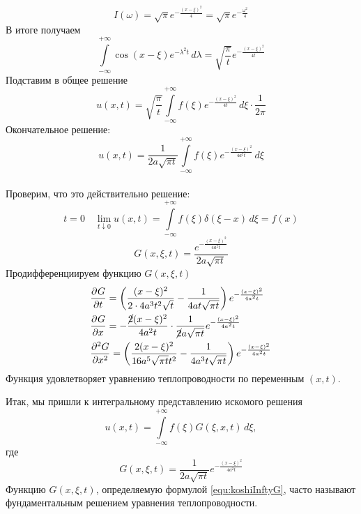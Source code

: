 \[I(\omega) = \sqrt{\pi} e^{- \frac{(x - \xi)^2}{4}} = \sqrt{\pi} e^{-\frac{\omega^2}{4}}\]
В итоге получаем
\[\int\limits_{- \infty}^{ + \infty} \cos (x - \xi) e^{- \lambda^2 t} \, d \lambda = \sqrt{\frac{\pi}{t}}  e^{- \frac{(x - \xi)^2}{4 t}}\]
Подставим в общее решение
\[u(x, t) = \sqrt{\frac{\pi}{t}} \int\limits_{- \infty}^{ + \infty} f(\xi) e^{- \frac{(x - \xi)^2}{4 t}} \, d \xi \cdot \frac{1}{2 \pi}\]
Окончательное решение:\\
\[u(x, t) = \frac{1}{2 a \sqrt{\pi t}} \int\limits_{- \infty}^{ + \infty} f(\xi)  e^{- \frac{(x - \xi)^2}{4 a^2 t}} \, d \xi\]\\
Проверим, что это действительно решение:\\
\[t=0 \quad \lim\limits_{t \downarrow 0} u(x, t) = \int\limits_{- \infty}^{ + \infty} f(\xi) \delta (\xi - x) \, d \xi = f(x)\]
\[G(x, \xi, t) = \frac{e^{- \frac{(x - \xi)^2}{4 a^2 t}}}{2 a \sqrt{\pi t}}\]
Продифференциируем функцию $G(x, \xi, t)$
\begin{align*}
	&\frac{\partial^{}G}{\partial t^{}} = \left( \frac{(x - \xi)^2}{2\cdot 4 a^3 t^2 \sqrt{t}} -\frac{1}{4 a t \sqrt{\pi t}}  \right) e^{- \frac{(x - \xi)^2}{4 a^2 t}}\\
	&\frac{\partial^{}G}{\partial x^{}} = - \frac{\cancel 2 (x - \xi)^2}{4 a^2 t} \cdot \frac{1}{\cancel 2 a \sqrt{\pi t}} e^{- \frac{(x - \xi)^2}{4 a^2 t}}\\
	&\frac{\partial^{2}G}{\partial x^{2}} = \left(\frac{2 (x - \xi)^2}{16 a^5 \sqrt{\pi t} t^2} - \frac{1}{4 a^3 t \sqrt{\pi t}} \right) e^{- \frac{(x - \xi)^2}{4 a^2 t}}
\end{align*}
Функция удовлетворяет уравнению теплопроводности по переменным $(x, t)$.

Итак, мы пришли к интегральному представлению искомого решения
\[
	u(x, t) = \int\limits_{- \infty}^{ + \infty} f(\xi)G(\xi, x, t) \, d \xi ,
\]
где
\begin{equation}
	G(x, \xi, t) = \frac{1}{2 a \sqrt{\pi t}} e^{- \frac{(x - \xi)^2}{4 a^2 t}}
	\label{equ:koshiInftyG}
\end{equation}
			Функцию $G(x, \xi, t)$, определяемую формулой \eqref{equ:koshiInftyG}, часто называют фундаментальным решением уравнения теплопроводности.
